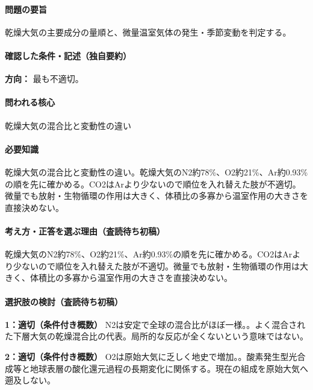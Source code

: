 \paragraph{問題の要旨} 乾燥大気の主要成分の量順と、微量温室気体の発生・季節変動を判定する。

\paragraph{確認した条件・記述（独自要約）}\mbox{}\par

\noindent\textbf{方向：} 最も不適切。\par

\paragraph{問われる核心} 乾燥大気の混合比と変動性の違い

\paragraph{必要知識} 乾燥大気の混合比と変動性の違い。乾燥大気のN2約78\%、O2約21\%、Ar約0.93\%の順を先に確かめる。CO2はArより少ないので順位を入れ替えた肢が不適切。微量でも放射・生物循環の作用は大きく、体積比の多寡から温室作用の大きさを直接決めない。

\paragraph{考え方・正答を選ぶ理由（査読待ち初稿）} 乾燥大気のN2約78\%、O2約21\%、Ar約0.93\%の順を先に確かめる。CO2はArより少ないので順位を入れ替えた肢が不適切。微量でも放射・生物循環の作用は大きく、体積比の多寡から温室作用の大きさを直接決めない。

\paragraph{選択肢の検討（査読待ち初稿）}\mbox{}\par

\noindent\textbf{1：適切（条件付き概数）} N2は安定で全球の混合比がほぼ一様。。よく混合された下層大気の乾燥混合比の代表。局所的な反応が全くないという意味ではない。\par

\noindent\textbf{2：適切（条件付き概数）} O2は原始大気に乏しく地史で増加。。酸素発生型光合成等と地球表層の酸化還元過程の長期変化に関係する。現在の組成を原始大気へ遡及しない。\par


